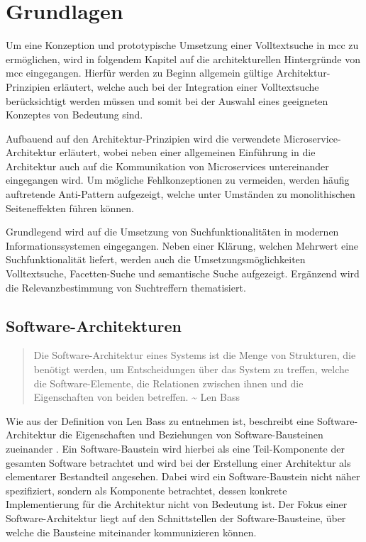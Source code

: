 \chapter{Grundlagen\label{chap2:Zweites-Kapitel}}

Um eine Konzeption und prototypische Umsetzung einer Volltextsuche in \gls{mcc} zu ermöglichen, wird in folgendem Kapitel auf die architekturellen Hintergründe von \gls{mcc} eingegangen. Hierfür werden zu Beginn allgemein gültige Architektur-Prinzipien erläutert, welche auch bei der Integration einer Volltextsuche berücksichtigt werden müssen und somit bei der Auswahl eines geeigneten Konzeptes von Bedeutung sind.

Aufbauend auf den Architektur-Prinzipien wird die verwendete Microservice-Architektur erläutert, wobei neben einer allgemeinen Einführung in die Architektur auch auf die Kommunikation von Microservices untereinander eingegangen wird. Um mögliche Fehlkonzeptionen zu vermeiden, werden häufig auftretende Anti-Pattern aufgezeigt, welche unter Umständen zu monolithischen Seiteneffekten führen können.

Grundlegend wird auf die Umsetzung von Suchfunktionalitäten in modernen Informationssystemen eingegangen. Neben einer Klärung, welchen Mehrwert eine Suchfunktionalität liefert, werden auch die Umsetzungsmöglichkeiten \glqq Volltextsuche\grqq{}, \glqq Facetten-Suche\grqq{} und \glqq semantische Suche\grqq{} aufgezeigt. Ergänzend wird die Relevanzbestimmung von Suchtreffern thematisiert.

\section{Software-Architekturen\label{sec2.1:Unterpunkt-1}}

\begin{quote}
    Die Software-Architektur eines Systems ist die Menge von Strukturen, die benötigt werden, um Entscheidungen über das System zu treffen, welche die Software-Elemente, die Relationen zwischen ihnen und die Eigenschaften von beiden betreffen. \textasciitilde{} Len Bass \cite[S. 4]{Bass.2013}
\end{quote}

Wie aus der Definition von Len Bass zu entnehmen ist, beschreibt eine Software-Architektur die Eigenschaften und Beziehungen von Software-Bausteinen zueinander \cite[S. 4]{Bass.2013}. Ein Software-Baustein wird hierbei als eine Teil-Komponente der gesamten Software betrachtet und wird bei der Erstellung einer Architektur als elementarer Bestandteil angesehen. Dabei wird ein Software-Baustein nicht näher spezifiziert, sondern als Komponente betrachtet, dessen konkrete Implementierung für die Architektur nicht von Bedeutung ist. Der Fokus einer Software-Architektur liegt auf den Schnittstellen der Software-Bausteine, über welche die Bausteine miteinander kommunizieren können.

